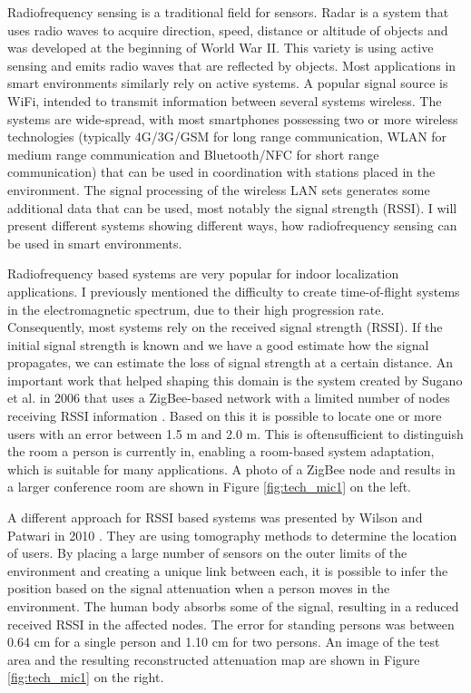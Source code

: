 Radiofrequency sensing is a traditional field for sensors. Radar is a system that uses radio waves to acquire direction, speed, distance or altitude of objects and was developed at the beginning of World War II. This variety is using active sensing and emits radio waves that are reflected by objects. Most applications in smart environments similarly rely on active systems. A popular signal source is WiFi, intended to transmit information between several systems wireless. The systems are wide-spread, with most smartphones possessing two or more wireless technologies (typically 4G/3G/GSM for long range communication, WLAN for medium range communication and Bluetooth/NFC for short range communication) that can be used in coordination with stations placed in the environment. The signal processing of the wireless LAN sets generates some additional data that can be used, most notably the signal strength (RSSI). I will present different systems showing different ways, how radiofrequency sensing can be used in smart environments.

Radiofrequency based systems are very popular for indoor localization applications. I previously mentioned the difficulty to create time-of-flight systems in the electromagnetic spectrum, due to their high progression rate. Consequently, most systems rely on  the received signal strength (RSSI). If the initial signal strength is known and we have a good estimate how the signal propagates, we can estimate the loss of signal strength at a certain distance. An important work that helped shaping this domain is the system created by Sugano et al. in 2006 that uses a ZigBee-based network with a limited number of nodes receiving RSSI information \cite{sugano2006indoor}. Based on this it is possible to locate one or more users with an error between 1.5 m and 2.0 m. This is oftensufficient to distinguish the room a person is currently in, enabling a room-based system adaptation, which is suitable for many applications. A photo of a ZigBee node and results in a larger conference room are shown in Figure \ref{fig:tech_mic1} on the left.

A different approach for RSSI based systems was presented by Wilson and Patwari in 2010 \cite{wilson2010radio}. They are using tomography methods to determine the location of users. By placing a large number of sensors on the outer limits of the environment and creating a unique link between each, it is possible to infer the position based on the signal attenuation when a person moves in the environment. The human body absorbs some of the signal, resulting in a reduced received RSSI in the affected nodes. The error for standing persons was between 0.64 cm for a single person and 1.10 cm for two persons. An image of the test area and the resulting reconstructed attenuation map are shown in Figure \ref{fig:tech_mic1} on the right.

